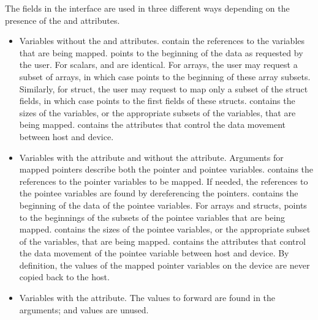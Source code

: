 The fields in the interface are used in three different ways depending on the presence of the  and  attributes.

%
\begin{itemize}
  \item Variables without the  and  attributes.   contain the references to the variables that are being mapped.   points to the beginning of the data as requested by the user. For scalars,   and  are identical. For arrays, the user may request a subset of arrays, in which case  points to the beginning of these array subsets. Similarly, for struct, the user may request to map only a subset of the struct fields, in which case   points to the first fields of these structs.  contains the sizes of the variables, or the appropriate subsets of the variables, that are being mapped.  contains the attributes that control the data movement between host and device.

  \item Variables with the  attribute and without the  attribute. Arguments for mapped pointers describe both the pointer and pointee variables.   contains the references to the pointer variables to be mapped.  If needed, the references to the pointee variables are found by dereferencing the  pointers.  contains the beginning of the data of the pointee variables.   For arrays and structs,  points to the beginnings of the subsets of the pointee variables that are being mapped.  contains the sizes of the pointee variables, or the appropriate subset of the variables, that are being mapped.   contains the attributes that control the data movement of the pointee variable between host and device. By definition, the values of the mapped pointer variables on the device are never copied back to the host.
  
  \item Variables with the  attribute. The values to forward are found in the  arguments;   and  values are unused.
%
\end{itemize}

\fussy

